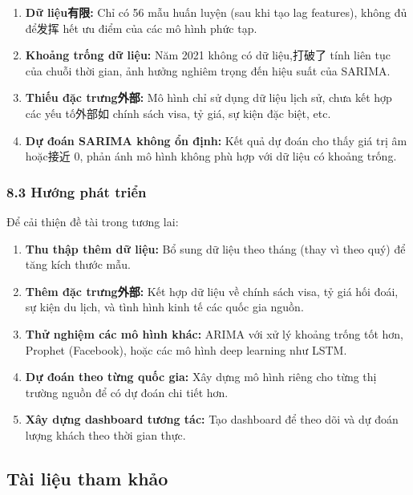 \documentclass[11pt]{article}
\begin{document}
\begin{enumerate}
\def\labelenumi{\arabic{enumi}.}
\item
  \textbf{Dữ liệu有限:} Chỉ có 56 mẫu huấn luyện (sau khi tạo lag
  features), không đủ để发挥 hết ưu điểm của các mô hình phức tạp.
\item
  \textbf{Khoảng trống dữ liệu:} Năm 2021 không có dữ liệu,打破了 tính
  liên tục của chuỗi thời gian, ảnh hưởng nghiêm trọng đến hiệu suất của
  SARIMA.
\item
  \textbf{Thiếu đặc trưng外部:} Mô hình chỉ sử dụng dữ liệu lịch sử,
  chưa kết hợp các yếu tố外部如 chính sách visa, tỷ giá, sự kiện đặc
  biệt, etc.
\item
  \textbf{Dự đoán SARIMA không ổn định:} Kết quả dự đoán cho thấy giá
  trị âm hoặc接近 0, phản ánh mô hình không phù hợp với dữ liệu có
  khoảng trống.
\end{enumerate}

\subsubsection{8.3 Hướng phát
triển}\label{hux1b0ux1edbng-phuxe1t-triux1ec3n}

Để cải thiện đề tài trong tương lai:

\begin{enumerate}
\def\labelenumi{\arabic{enumi}.}
\item
  \textbf{Thu thập thêm dữ liệu:} Bổ sung dữ liệu theo tháng (thay vì
  theo quý) để tăng kích thước mẫu.
\item
  \textbf{Thêm đặc trưng外部:} Kết hợp dữ liệu về chính sách visa, tỷ
  giá hối đoái, sự kiện du lịch, và tình hình kinh tế các quốc gia
  nguồn.
\item
  \textbf{Thử nghiệm các mô hình khác:} ARIMA với xử lý khoảng trống tốt
  hơn, Prophet (Facebook), hoặc các mô hình deep learning như LSTM.
\item
  \textbf{Dự đoán theo từng quốc gia:} Xây dựng mô hình riêng cho từng
  thị trường nguồn để có dự đoán chi tiết hơn.
\item
  \textbf{Xây dựng dashboard tương tác:} Tạo dashboard để theo dõi và dự
  đoán lượng khách theo thời gian thực.
\end{enumerate}

    \subsection{Tài liệu tham khảo}\label{tuxe0i-liux1ec7u-tham-khux1ea3o}
\end{document}
